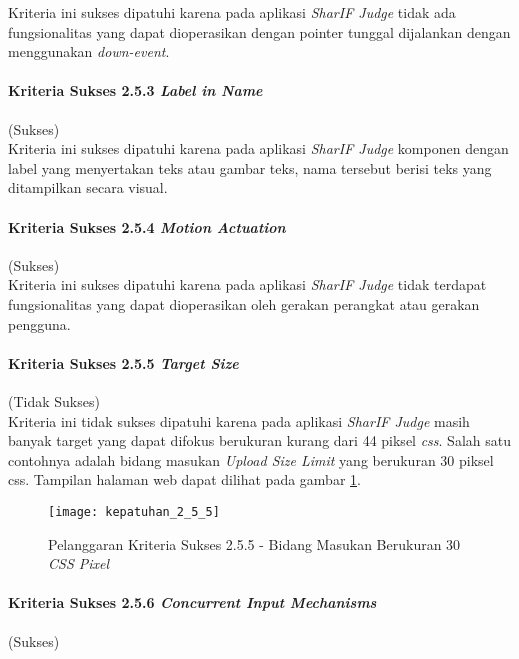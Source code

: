 Kriteria ini sukses dipatuhi karena pada aplikasi \textit{SharIF Judge} tidak ada fungsionalitas yang dapat dioperasikan dengan pointer tunggal dijalankan dengan menggunakan \textit{down-event}.

\paragraph{Kriteria Sukses 2.5.3 \textit{Label in Name}}
\label{subsubsec:kepatuhan_kriteria_2.5.3}
(Sukses) \\

Kriteria ini sukses dipatuhi karena pada aplikasi \textit{SharIF Judge} komponen dengan label yang menyertakan teks atau gambar teks, nama tersebut berisi teks yang ditampilkan secara visual.

\paragraph{Kriteria Sukses 2.5.4 \textit{Motion Actuation}}
\label{subsubsec:kepatuhan_kriteria_2.5.4}
(Sukses) \\

Kriteria ini sukses dipatuhi karena pada aplikasi \textit{SharIF Judge} tidak terdapat fungsionalitas yang dapat dioperasikan oleh gerakan perangkat atau gerakan pengguna.

\paragraph{Kriteria Sukses 2.5.5 \textit{Target Size}}
\label{subsubsec:kepatuhan_kriteria_2.5.5}
(Tidak Sukses) \\

Kriteria ini tidak sukses dipatuhi karena pada aplikasi \textit{SharIF Judge} masih banyak target yang dapat difokus berukuran kurang dari 44 piksel \textit{css}. Salah satu contohnya adalah bidang masukan \textit{Upload Size Limit} yang berukuran 30 piksel css. Tampilan halaman web dapat dilihat pada gambar \ref{fig:kepatuhan_2_5_5}.

\begin{figure}[H]
	\centering  
	\texttt{[image: kepatuhan\_2\_5\_5]}  
	\caption[Pelanggaran Kriteria Sukses 2.5.5 - Bidang Masukan Berukuran 30 \textit{CSS Pixel}]{Pelanggaran Kriteria Sukses 2.5.5 - Bidang Masukan Berukuran 30 \textit{CSS Pixel}} 
	\label{fig:kepatuhan_2_5_5} 
\end{figure}

\paragraph{Kriteria Sukses 2.5.6 \textit{Concurrent Input Mechanisms}}
\label{subsubsec:kepatuhan_kriteria_2.5.6}
(Sukses) \\

